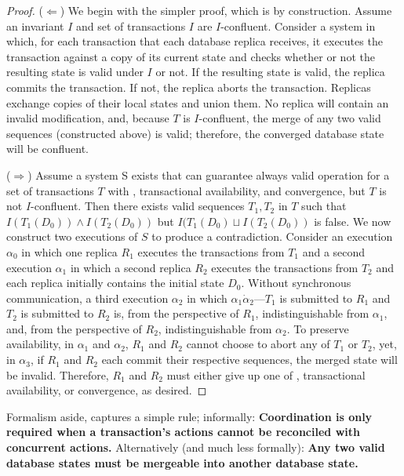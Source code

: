 \begin{proof}
($\Leftarrow$) We begin with the simpler proof, which is by
  construction. Assume an invariant $I$ and set of transactions $I$
  are $I$-confluent. Consider a system in which, for each transaction
  that each database replica receives, it executes the transaction
  against a copy of its current state and checks whether or not the
  resulting state is valid under $I$ or not. If the resulting state is
  valid, the replica commits the transaction. If not, the replica
  aborts the transaction. Replicas exchange copies of their local
  states and union them. No replica will contain an invalid
  modification, and, because $T$ is $I$-confluent, the merge of any
  two valid sequences (constructed above) is valid; therefore, the
  converged database state will be confluent.

($\Rightarrow$) Assume a system S exists that can guarantee always
  valid operation for a set of transactions $T$ with \cfreedom,
  transactional availability, and convergence, but $T$ is not
  $I$-confluent. Then there exists valid sequences $T_1,T_2$ in $T$
  such that $I(T_1(D_0)) \wedge I(T_2(D_0))$ but $I(T_1(D_0) \sqcup
  I(T_2(D_0))$ is false. We now construct two executions of $S$ to
  produce a contradiction. Consider an execution $\alpha_0$ in which
  one replica $R_1$ executes the transactions from $T_1$ and a second
  execution $\alpha_1$ in which a second replica $R_2$ executes the
  transactions from $T_2$ and each replica initially contains the
  initial state $D_0$. Without synchronous communication, a third
  execution $\alpha_2$ in which $\alpha_1 \dot \alpha_2$---$T_1$ is
  submitted to $R_1$ and $T_2$ is submitted to $R_2$ is, from the
  perspective of $R_1$, indistinguishable from $\alpha_1$, and, from
  the perspective of $R_2$, indistinguishable from $\alpha_2$. To
  preserve availability, in $\alpha_1$ and $\alpha_2$, $R_1$ and $R_2$
  cannot choose to abort any of $T_1$ or $T_2$, yet, in $\alpha_3$, if
  $R_1$ and $R_2$ each commit their respective sequences, the merged
  state will be invalid. Therefore, $R_1$ and $R_2$ must either give
  up one of \cfreedom, transactional availability, or convergence, as
  desired.
\end{proof}

Formalism aside, \iconfluence captures a simple rule;
informally: \textbf{Coordination is only required when a transaction's
  actions cannot be reconciled with concurrent actions.}
Alternatively (and much less formally): \textbf{Any two valid database
  states must be mergeable into another database state.}

